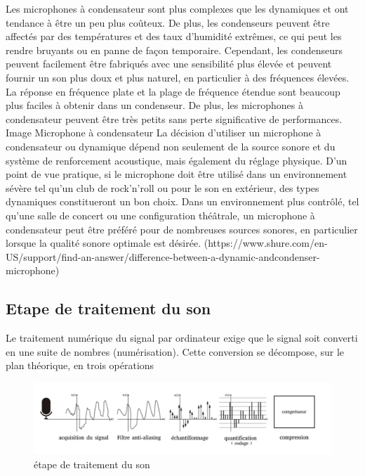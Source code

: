 \documentclass[a4paper, 12pt]{book}
\begin{document}
Les microphones à condensateur sont plus complexes que les dynamiques et ont tendance à être un peu plus coûteux. De plus, les condenseurs peuvent être affectés par des températures et des taux d'humidité extrêmes, ce qui peut les rendre bruyants ou en panne de façon temporaire. Cependant, les condenseurs peuvent facilement être fabriqués avec une sensibilité plus élevée et peuvent fournir un son plus doux et plus naturel, en particulier à des fréquences élevées. La réponse en fréquence plate et la plage de fréquence étendue sont beaucoup plus faciles à obtenir dans un condenseur. De plus, les microphones à condensateur peuvent être très petits sans perte significative de performances. Image Microphone à condensateur La décision d’utiliser un microphone à condensateur ou dynamique dépend non seulement de la source sonore et du système de renforcement acoustique, mais également du réglage physique. D'un point de vue pratique, si le microphone doit être utilisé dans un environnement sévère tel qu'un club de rock'n'roll ou pour le son en extérieur, des types dynamiques constitueront un bon choix. Dans un environnement plus contrôlé, tel qu'une salle de concert ou une configuration théâtrale, un microphone à condensateur peut être préféré pour de nombreuses sources sonores, en particulier lorsque la qualité sonore optimale est désirée. (https://www.shure.com/en-US/support/find-an-answer/difference-between-a-dynamic-andcondenser-microphone)

\subsection{Etape de traitement du son}

Le traitement numérique du signal par ordinateur exige que le signal soit converti en une suite de nombres (numérisation). Cette conversion se décompose, sur le plan théorique, en trois opérations

\begin{figure}[htbp]
  \centering
  \includegraphics[width=1.2\linewidth]{fig/etape-acquisition-son.png}
  \caption{étape de traitement du son}
\end{figure}
\end{document}
